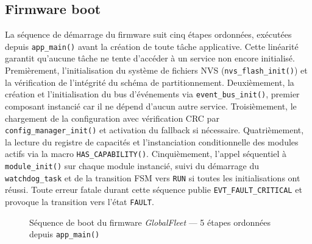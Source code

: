 \subsection{Firmware boot}
\label{subsec:boot}

La séquence de démarrage du firmware suit cinq étapes ordonnées,
exécutées depuis \texttt{app\_main()} avant la création de toute
tâche applicative. Cette linéarité garantit qu'aucune tâche ne tente
d'accéder à un service non encore initialisé. Premièrement,
l'initialisation du système de fichiers NVS (\texttt{nvs\_flash\_init()})
et la vérification de l'intégrité du schéma de partitionnement.
Deuxièmement, la création et l'initialisation du bus d'événements
via \texttt{event\_bus\_init()}, premier composant instancié car il
ne dépend d'aucun autre service. Troisièmement, le chargement de la
configuration avec vérification CRC par \texttt{config\_manager\_init()}
et activation du fallback si nécessaire. Quatrièmement, la lecture
du registre de capacités et l'instanciation conditionnelle des modules
actifs via la macro \texttt{HAS\_CAPABILITY()}. Cinquièmement, l'appel
séquentiel à \texttt{module\_init()} sur chaque module instancié,
suivi du démarrage du \texttt{watchdog\_task} et de la transition FSM
vers \texttt{RUN} si toutes les initialisations ont réussi. Toute
erreur fatale durant cette séquence publie \texttt{EVT\_FAULT\_CRITICAL}
et provoque la transition vers l'état \texttt{FAULT}.

\begin{figure}[H]
\centering
{}
\caption{Séquence de boot du firmware \textit{GlobalFleet} --- 5 étapes ordonnées depuis \texttt{app\_main()}}
\label{fig:boot_seq}
\end{figure}

